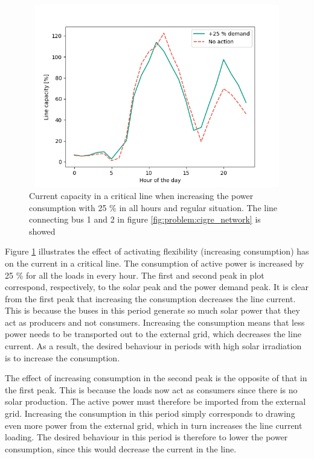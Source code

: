 \documentclass[class=book, crop=false, 11pt]{standalone}
\begin{document}
\begin{figure}[ht]
    \center
\includegraphics[height=8cm, width=12cm]{figures/increase_demand_current.png}
    \caption {Current capacity in a critical line when increasing the power consumption with 25 \% in all hours and regular situation. The line connecting bus 1 and 2 in figure \ref{fig:problem:cigre_network} is showed}
    \label{fig:results:increase_demand_current}
\end{figure}

Figure \ref{fig:results:increase_demand_current} illustrates the effect of activating flexibility (increasing consumption) has on the current in a critical line. The consumption of active power is increased by 25 \% for all the loads in every hour. The first and second peak in plot correspond, respectively, to the solar peak and the power demand peak. It is clear from the first peak that increasing the consumption decreases the line current. This is because the buses in this period generate so much solar power that they act as producers and not consumers. Increasing the consumption means that less power needs to be transported out to the external grid, which decreases the line current. As a result, the desired behaviour in periods with high solar irradiation is to increase the consumption.

The effect of increasing consumption in the second peak is the opposite of that in the first peak. This is because the loads now act as consumers since there is no solar production. The active power must therefore be imported from the external grid. Increasing the consumption in this period simply corresponds to drawing even more power from the external grid, which in turn increases the line current loading. The desired behaviour in this period is therefore to lower the power consumption, since this would decrease the current in the line. 
\end{document}
